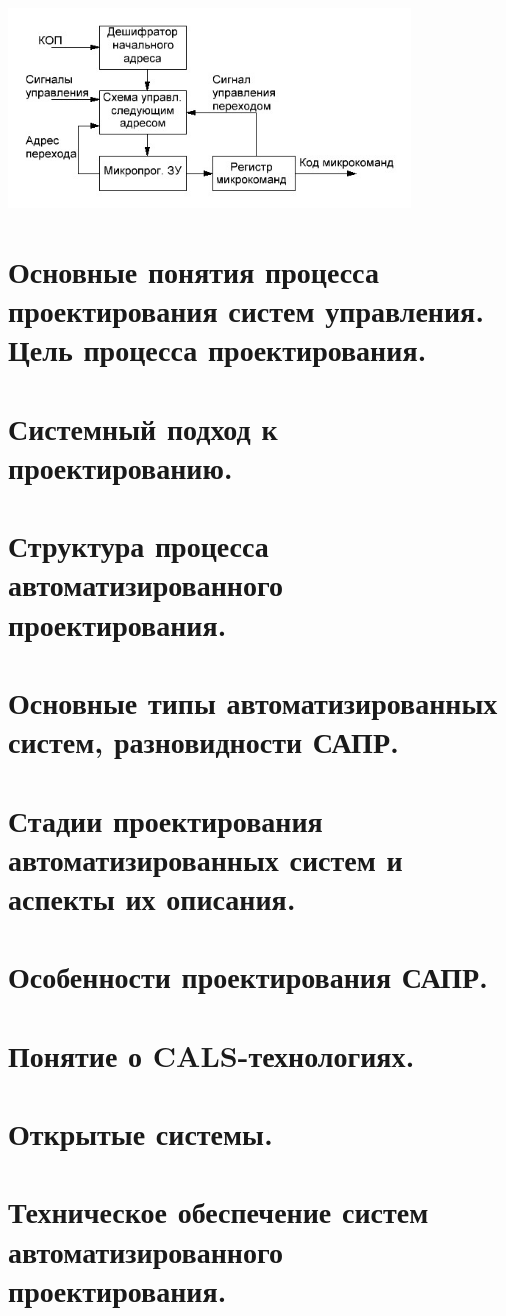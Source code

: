 \documentclass[unicode, 12pt, a4paper, oneside]{article}
\begin{document}
\begin{center}
\includegraphics[width=0.8\textwidth]{120_microprog.png}
\end{center}
\section{Основные понятия процесса проектирования систем управления. Цель процесса проектирования.}
\section{Системный подход к проектированию.}
\section{Структура процесса автоматизированного проектирования.}
\section{Основные типы автоматизированных систем, разновидности САПР.}
\section{Стадии проектирования автоматизированных систем и аспекты их описания.}
\section{Особенности проектирования САПР.}
\section{Понятие о CALS-технологиях.}
\section{Открытые системы.}
\section{Техническое обеспечение систем автоматизированного проектирования.}
\end{document}
